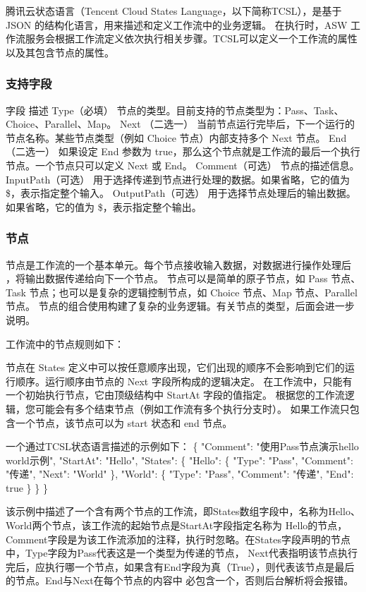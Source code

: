 腾讯云状态语言（Tencent Cloud States Language，以下简称TCSL），是基于 JSON 的结构化语言，用来描述和定义工作流中的业务逻辑。
在执行时，ASW 工作流服务会根据工作流定义依次执行相关步骤。TCSL可以定义一个工作流的属性以及其包含节点的属性。

\subsubsection{支持字段}

字段	描述
Type（必填）	节点的类型。目前支持的节点类型为：Pass、Task、Choice、Parallel、Map。
Next （二选一）	当前节点运行完毕后，下一个运行的节点名称。某些节点类型（例如 Choice 节点）内部支持多个 Next 节点。
End（二选一）	如果设定 End 参数为 true，那么这个节点就是工作流的最后一个执行节点。一个节点只可以定义 Next 或 End。
Comment（可选）	节点的描述信息。
InputPath（可选）	用于选择传递到节点进行处理的数据。如果省略，它的值为 \$，表示指定整个输入。
OutputPath（可选）	用于选择节点处理后的输出数据。如果省略，它的值为 \$，表示指定整个输出。


\subsubsection{节点}
节点是工作流的一个基本单元\cite{jyrq}。每个节点接收输入数据，对数据进行操作处理后 ，将输出数据传递给向下一个节点。
节点可以是简单的原子节点，如 Pass 节点、Task 节点；也可以是复杂的逻辑控制节点，如 Choice 节点、Map 节点、Parallel 节点。
节点的组合使用构建了复杂的业务逻辑。有关节点的类型，后面会进一步说明。

工作流中的节点规则如下：

节点在 States 定义中可以按任意顺序出现，它们出现的顺序不会影响到它们的运行顺序。运行顺序由节点的 Next 字段所构成的逻辑决定。
在工作流中，只能有一个初始执行节点，它由顶级结构中 StartAt 字段的值指定\cite{jysrv6}。
根据您的工作流逻辑，您可能会有多个结束节点（例如工作流有多个执行分支时）。
如果工作流只包含一个节点，该节点可以为 start 状态和 end 节点。



一个通过TCSL状态语言描述的示例如下：
\{
    "Comment": "使用Pass节点演示hello world示例",
    "StartAt": "Hello",
    "States": \{
    "Hello": \{
        "Type": "Pass",
        "Comment": "传递",
        "Next": "World"
    \},
    "World": \{
        "Type": "Pass",
        "Comment": "传递",
        "End": true
    \}
\}
\}

该示例中描述了一个含有两个节点的工作流，即States数组字段中，名称为Hello、World两个节点，该工作流的起始节点是StartAt字段指定名称为
Hello的节点，Comment字段是为该工作流添加的注释，执行时忽略。在States字段声明的节点中，Type字段为Pass代表这是一个类型为传递的节点，
Next代表指明该节点执行完后，应执行哪一个节点，如果含有End字段为真（True），则代表该节点是最后的节点。End与Next在每个节点的内容中
必包含一个，否则后台解析将会报错。

